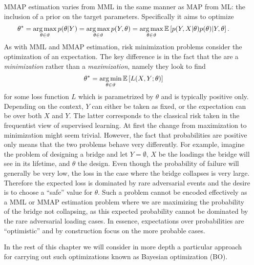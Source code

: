 MMAP estimation varies from MML in the same manner as MAP from ML: the inclusion
of a prior on the target parameters.  Specifically it aims to optimize
\begin{align}
\label{eq:opt:MMAP}
\theta^* &= \operatorname*{arg\,max}_{\theta \in \vartheta} p(\theta | Y)  = \operatorname*{arg\,max}_{\theta \in \vartheta} p(Y,\theta) 
= \operatorname*{arg\,max}_{\theta \in \vartheta} \mathbb{E} \left[p(Y,X|\theta) p(\theta) | Y, \theta\right].
\end{align}
As with MML and MMAP estimation, risk minimization problems consider the optimization
of an expectation.  The key difference is in the fact that the are a \textit{minimization} rather
than a \textit{maximization}, namely they look to find
\begin{align}
\label{eq:opt:riskmin}
\theta^* &= \operatorname*{arg\,min}_{\theta \in \vartheta}  \mathbb{E} \left[L(X,Y;\theta)\right]
\end{align}
for some loss function $L$ which is parametrized by $\theta$ and is typically positive only.
Depending on the context, $Y$ can either be taken as fixed, or the expectation can be over
both $X$ and $Y$.  The latter corresponds to the classical risk taken in the frequentist view
of supervised learning.
At first the change from
maximization to minimization might seem trivial.  However,
the fact that probabilities are positive only means that the two problems behave very
differently.  For example, imagine the problem of designing a bridge and let 
$Y=\emptyset$, $X$ be the loadings the bridge will see in its lifetime, and $\theta$
the design.  Even though the probability of failure will generally be very low, the
loss in the case where the bridge collapses is very large.  Therefore the expected loss
is dominated by rare adversarial events and the desire is to choose a ``safe'' value for
$\theta$.  Such a problem cannot be encoded effectively as a MML or MMAP estimation
problem where we are maximizing the probability of the bridge not collapsing,
as this expected probability cannot be dominated by the rare adversarial loading cases.
In essence, expectations over probabilities are ``optimistic'' and by construction
focus on the more probable cases.

In the rest of this chapter we will consider in more depth a particular approach
for carrying out such optimizations known as Bayesian optimization (BO).
